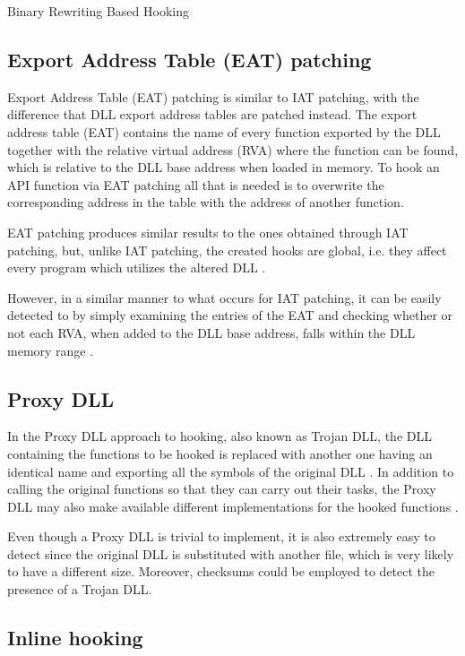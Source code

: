 \documentclass[binding=0.6cm,LaM,english,noexaminfo,oneside]{sapthesis} %
\begin{document}
\begin{section}{Binary Rewriting Based Hooking}
\subsection{Export Address Table (EAT) patching}

Export Address Table (EAT) patching is similar to IAT patching, with the difference that DLL export address tables are patched instead. The export address table (EAT) contains the name of every function exported by the DLL together with the relative virtual address (RVA) where the function can be found, which is relative to the DLL base address when loaded in memory. To hook an API function via EAT patching all that is needed is to overwrite the corresponding address in the table with the address of another function.

EAT patching produces similar results to the ones obtained through IAT patching, but, unlike IAT patching, the created hooks are global, i.e. they affect every program which utilizes the altered DLL \cite{Berdajs:2010:EAU:1815744.1815746}.

However, in a similar manner to what occurs for IAT patching, it can be easily detected to by simply examining the entries of the EAT and checking whether or not each RVA, when added to the DLL base address, falls within the DLL memory range \cite{Stuttard:2014:ADC:2616217}.

\subsection{Proxy DLL}

In the Proxy DLL approach to hooking, also known as Trojan DLL, the DLL containing the functions to be hooked is replaced with another one having an identical name and exporting all the symbols of the original DLL \cite{CodeProjectHooking}. In addition to calling the original functions so that they can carry out their tasks, the Proxy DLL may also make available different implementations for the hooked functions \cite{Berdajs:2010:EAU:1815744.1815746}.

Even though a Proxy DLL is trivial to implement, it is also extremely easy to detect since the original DLL is substituted with another file, which is very likely to have a different size. Moreover, checksums could be employed to detect the presence of a Trojan DLL.


\subsection{Inline hooking}


\end{section}
\end{document}
